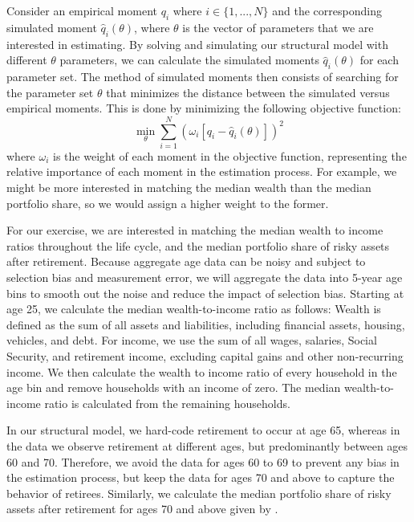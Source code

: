 \documentclass{article}
\begin{document}
Consider an empirical moment $q_i$ where $i \in \{1,...,N\}$ and the corresponding simulated moment $\hat{q}_i(\theta)$, where $\theta$ is the vector of parameters that we are interested in estimating.
By solving and simulating our structural model with different $\theta$ parameters, we can calculate the simulated moments $\hat{q}_i(\theta)$ for each parameter set.
The method of simulated moments then consists of searching for the parameter set $\theta$ that minimizes the distance between the simulated versus empirical moments.
This is done by minimizing the following objective function:
\begin{equation}
\min_{\theta} \sum_{i=1}^{N}  \left( \omega_i [q_i - \hat{q}_i(\theta) ] \right)^2
\end{equation}
where $\omega_i$ is the weight of each moment in the objective function, representing the relative importance of each moment in the estimation process.
For example, we might be more interested in matching the median wealth than the median portfolio share, so we would assign a higher weight to the former.

For our exercise, we are interested in matching the median wealth to income ratios throughout the life cycle, and the median portfolio share of risky assets after retirement.
Because aggregate age data can be noisy and subject to selection bias and measurement error, we will aggregate the data into 5-year age bins to smooth out the noise and reduce the impact of selection bias.
Starting at age 25, we calculate the median wealth-to-income ratio as follows: Wealth is defined as the sum of all assets and liabilities, including financial assets, housing, vehicles, and debt.
For income, we use the sum of all wages, salaries, Social Security, and retirement income, excluding capital gains and other non-recurring income.
We then calculate the wealth to income ratio of every household in the age bin and remove households with an income of zero.
The median wealth-to-income ratio is calculated from the remaining households.

In our structural model, we hard-code retirement to occur at age 65, whereas in the data we observe retirement at different ages, but predominantly between ages 60 and 70.
Therefore, we avoid the data for ages 60 to 69 to prevent any bias in the estimation process, but keep the data for ages 70 and above to capture the behavior of retirees.
Similarly, we calculate the median portfolio share of risky assets after retirement for ages 70 and above given by \cite{Aboagye2024}.
\end{document}
